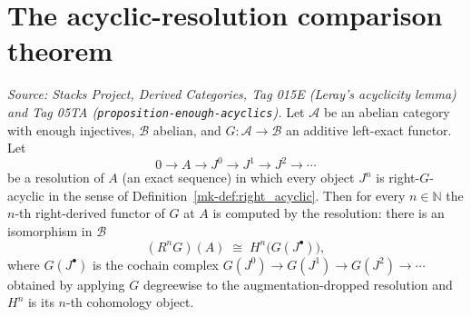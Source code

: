 \section{The acyclic-resolution comparison theorem}

\begin{theorem}\label{mk-lem:acyclic_resolution_computes_derived}
  \leanok

  \textit{Source: Stacks Project, Derived Categories, Tag 015E (Leray's acyclicity
  lemma) and Tag 05TA (\texttt{proposition-enough-acyclics}).}
  Let \(\mathcal{A}\) be an abelian category with enough injectives, \(\mathcal{B}\)
  abelian, and \(G : \mathcal{A} \to \mathcal{B}\) an additive left-exact functor.
  Let
  \[
    0 \longrightarrow A
      \longrightarrow J^0 \longrightarrow J^1 \longrightarrow J^2
      \longrightarrow \cdots
  \]
  be a resolution of \(A\) (an exact sequence) in which every object \(J^n\) is
  right-\(G\)-acyclic in the sense of Definition~\ref{mk-def:right_acyclic}. Then for
  every \(n \in \mathbb{N}\) the \(n\)-th right-derived functor of \(G\) at \(A\) is
  computed by the resolution: there is an isomorphism in \(\mathcal{B}\)
  \[
    (R^n G)(A) \;\cong\; H^n\bigl(G(J^\bullet)\bigr),
  \]
  where \(G(J^\bullet)\) is the cochain complex
  \(G(J^0) \to G(J^1) \to G(J^2) \to \cdots\) obtained by applying \(G\) degreewise
  to the augmentation-dropped resolution and \(H^n\) is its \(n\)-th cohomology
  object.
\end{theorem}
